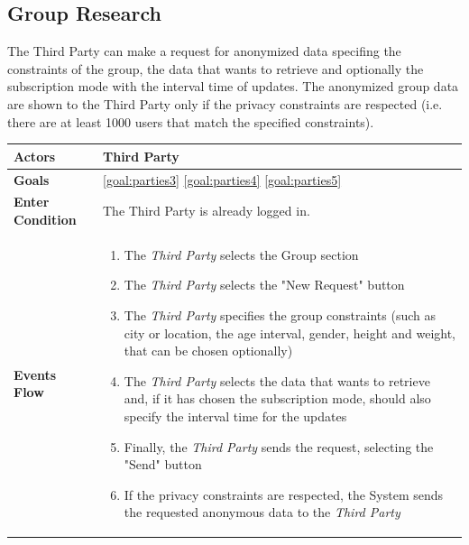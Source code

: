 \newpage
\subsection{Group Research}
The Third Party can make a request for anonymized data specifing the constraints of the group, the data that wants to retrieve and optionally the subscription mode with the interval time of updates. The anonymized group data are shown to the Third Party only if the privacy constraints are respected (i.e. there are at least 1000 users that match the specified constraints).

\begin{table}[H]
	\centering
    
    \begin{tabular}{|p{3.5cm}|p{10.3cm}|}
    
    \hline
    \textbf{\large{Actors}}  			& \tabitem Third Party 																\\
    \hline
    \textbf{\large{Goals}} 				& \ref{goal:parties3}                                                         \ref{goal:parties4}                                    \ref{goal:parties5} \\
    
    \hline
    
    \textbf{\large{Enter Condition}}	& The Third Party is already logged in. \\
    
    \hline
    
    \textbf{\large{Events Flow}}		& \begin{enumerate}[leftmargin=0.5cm]
                                \item The \emph{Third Party} selects the Group section
                                \item The \emph{Third Party} selects the "New Request" button
                                \item The \emph{Third Party} specifies the group constraints (such as city or location, the age interval, gender, height and weight, that can be chosen optionally)
                                 \item The \emph{Third Party} selects the data that wants to retrieve and, if it has chosen the subscription mode, should also specify the interval time for the updates
                                 \item Finally, the \emph{Third Party} sends the request, selecting the "Send" button
                                 \item If the privacy constraints are respected, the System sends the requested anonymous data to the \emph{Third Party}
                                           

\end{enumerate}
\end{tabular}
\end{table}
